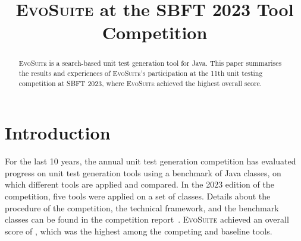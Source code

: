 \documentclass[10pt,conference]{IEEEtran}
\newcommand{\EVOSUITE}{\textsc{EvoSuite}\xspace}
\begin{document}
%

\title{\EVOSUITE at the SBFT 2023 Tool Competition}


\author{%
  \and
  \and
}

\maketitle

\begin{abstract}
  \EVOSUITE is a search-based unit test generation tool for Java. This paper summarises the results and experiences of \EVOSUITE's participation at the 11th unit testing competition at SBFT 2023, where \EVOSUITE achieved the highest overall score.
\end{abstract}


\section{Introduction}
%
For the last 10 years, the annual unit test generation competition has
evaluated progress on unit test generation tools using a benchmark of Java
classes, on which different tools are applied and compared. In the 2023 edition
of the competition, five tools were applied on a set of \cuts classes. Details
about the procedure of the competition, the technical framework, and the
benchmark classes can be found in the competition
report~\cite{SBST-toolcomp22}. \EVOSUITE achieved an overall score of \score,
which was the highest among the competing and baseline tools.


\end{document}
